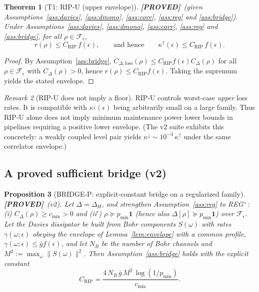 \documentclass[11pt]{article}
\newtheorem{theorem}{Theorem}[section]
\newtheorem{proposition}[theorem]{Proposition}
\theoremstyle{definition}
\theoremstyle{remark}
\newtheorem{remark}[theorem]{Remark}
\newcommand{\PROVED}{\textcolor{green!60!black}{\textbf{[PROVED]}}}
\begin{document}
\begin{theorem}[T1: RIP-U (upper envelope)]
\label{thm:ripu}
\PROVED\ (given Assumptions~\ref{ass:davies}, \ref{ass:dmono},
\ref{ass:corr}, \ref{ass:reg} and \ref{ass:bridge}). Under
Assumptions~\ref{ass:davies}, \ref{ass:dmono}, \ref{ass:corr},
\ref{ass:reg} and \ref{ass:bridge}, for all $\rho \in
\mathcal{F}_\epsilon$,
\[
r(\rho) \le C_{\mathrm{RIP}}\, f(\epsilon), \qquad \text{and hence}
\qquad \kappa^{\uparrow}(\epsilon) \le C_{\mathrm{RIP}}\, f(\epsilon).
\]
\end{theorem}

\begin{proof}
By Assumption~\ref{ass:bridge}, $\dot{C}_{\Delta,\mathrm{loss}}(\rho)
\le C_{\mathrm{RIP}} f(\epsilon) C_\Delta(\rho)$ for all $\rho \in
\mathcal{F}_\epsilon$ with $C_\Delta(\rho) > 0$, hence $r(\rho) \le
C_{\mathrm{RIP}} f(\epsilon)$. Taking the supremum yields the stated
envelope.
\end{proof}

\begin{remark}[RIP-U does not imply a floor]
\label{rem:nofloor}
RIP-U controls worst-case \emph{upper} loss rates. It is compatible with
$\kappa^{\downarrow}(\epsilon)$ being arbitrarily small on a large
family. Thus RIP-U alone does not imply minimum maintenance power lower
bounds in pipelines requiring a positive lower envelope. (The v2 suite
exhibits this concretely: a weakly coupled level pair yields
$\kappa^{\downarrow} \sim 10^{-3}\,\kappa^{\uparrow}$ under the same
correlator envelope.)
\end{remark}

\subsection{A proved sufficient bridge (v2)}

\begin{proposition}[BRIDGE-P: explicit-constant bridge on a regularized
family]
\label{prop:bridgep}
\PROVED\ (v2). Let $\Delta = \Delta_H$, and strengthen
Assumption~\ref{ass:reg} to REG$^{+}$: (i) $C_\Delta(\rho) \ge c_{\min} >
0$ and (ii$'$) $\rho \succeq p_{\min}\mathbf{1}$ (hence also
$\Delta[\rho] \succeq p_{\min}\mathbf{1}$) over $\mathcal{F}_\epsilon$.
Let the Davies dissipator be built from Bohr components $S(\omega)$ with
rates $\gamma(\omega;\epsilon)$ obeying the envelope of
Lemma~\ref{lem:envelope} with a common profile,
$\gamma(\omega;\epsilon) \le \bar{g} f(\epsilon)$, and let $N_B$ be the
number of Bohr channels and $M^2 := \max_\omega \|S(\omega)\|^2$. Then
Assumption~\ref{ass:bridge} holds with the explicit constant
\[
C_{\mathrm{RIP}} = \frac{4\, N_B\, \bar{g}\, M^2 \,
\log(1/p_{\min})}{c_{\min}}.
\]
\end{proposition}
\end{document}
